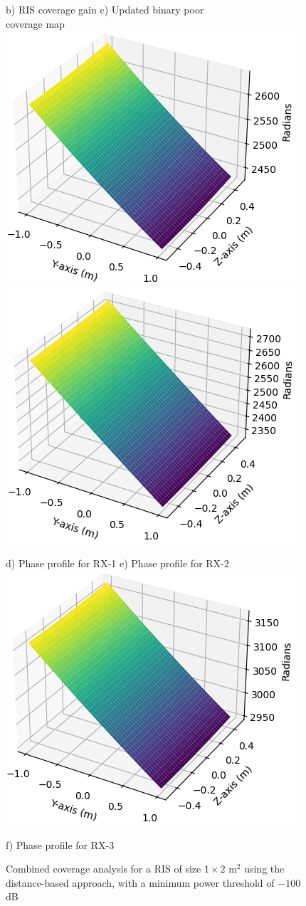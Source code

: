 \documentclass{IEEEoj}
\begin{document}
\begin{figure}
	\hspace{10pt} b) RIS coverage gain \hspace{30pt} c) Updated binary poor \\ \hspace{140pt} coverage map
	\includegraphics[width=0.48\linewidth]{Sim_Results/pp_-100dB_distance_RX1.png}
	\hfill
	\includegraphics[width=0.48\linewidth]{Sim_Results/pp_-100dB_distance_RX2.png}

	\hspace{10pt} d) Phase profile for RX-1 \hspace{15pt} e) Phase profile for RX-2 \\[5pt]
	
	\includegraphics[width=0.49\linewidth]{Sim_Results/pp_-100dB_distance_RX3.png}
	
	f) Phase profile for RX-3
	
	\caption{Combined coverage analysis for a RIS of size $1 \times 2$ m$^2$ using the distance-based approach, with a minimum power threshold of $-100$ dB}
	\label{comb_cov_distance}
\end{figure}
\end{document}
